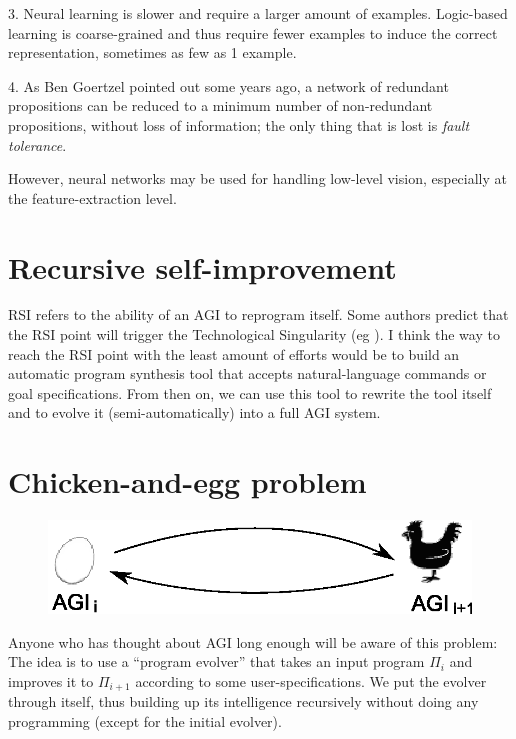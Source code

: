 \documentclass[a4paper]{report}
\begin{document}
3.  Neural learning is slower and require a larger amount of examples. Logic-based learning is coarse-grained and thus require fewer examples to induce the correct representation, sometimes as few as 1 example.

4.  As Ben Goertzel pointed out some years ago, a network of redundant propositions can be reduced to a minimum number of non-redundant propositions, without loss of information;  the only thing that is lost is \textit{fault tolerance}.

However, neural networks may be used for handling low-level vision, especially at the feature-extraction level.

\section{Recursive self-improvement}
\label{sec:RSI}

RSI refers to the ability of an AGI to reprogram itself.  Some authors predict that the RSI point will trigger the Technological Singularity (eg \citep*{Kurzweil}).  I think the way to reach the RSI point with the least amount of efforts would be to build an automatic program synthesis tool that accepts natural-language commands or goal specifications.  From then on, we can use this tool to rewrite the tool itself and to evolve it (semi-automatically) into a full AGI system.

\section{Chicken-and-egg problem}
\label{sec:chicken-and-egg}

\begin{figure}[H]
\centering
\includegraphics{chicken-and-egg1.eps}
\end{figure}
\vspace{-0.5cm}

Anyone who has thought about AGI long enough will be aware of this problem:  The idea is to use a ``program evolver'' that takes an input program $\Pi_i$ and improves it to $\Pi_{i+1}$ according to some user-specifications.  We put the evolver through itself, thus building up its intelligence recursively without doing any programming (except for the initial evolver).
\end{document}

